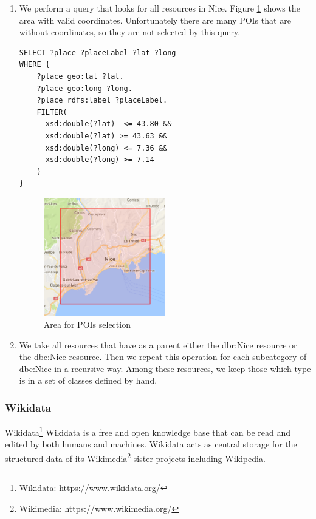 \documentclass[paper=a4, fontsize=11pt]{scrartcl}
\begin{document}
\begin{enumerate}
\item We perform a query that looks for all resources in Nice.
Figure \ref{fig:box} shows the area with valid coordinates.
Unfortunately there are many POIs that are without coordinates, so they are not selected by this query.
\begin{lstlisting}
SELECT ?place ?placeLabel ?lat ?long
WHERE {
    ?place geo:lat ?lat.
    ?place geo:long ?long.
    ?place rdfs:label ?placeLabel.
    FILTER(
      xsd:double(?lat)  <= 43.80 &&
      xsd:double(?lat) >= 43.63 &&
      xsd:double(?long) <= 7.36 &&
      xsd:double(?long) >= 7.14
    )
}
\end{lstlisting}
\begin{figure}[!htb]
  \centering
    \includegraphics[width=0.5\textwidth]{images/Nice.png}
    \caption{Area for POIs selection}
    \label{fig:box}
\end{figure}

\item We take all resources that have as a parent either the dbr:Nice resource or the dbc:Nice resource. Then we repeat this operation for each subcategory of dbc:Nice in a recursive way. Among these resources, we keep those which type is in a set of classes defined by hand.
\end{enumerate}
\subsubsection{Wikidata}
Wikidata\footnote{Wikidata: https://www.wikidata.org/} Wikidata is a free and open knowledge base that can be read and edited by both humans and machines. Wikidata acts as central storage for the structured data of its Wikimedia\footnote{Wikimedia: https://www.wikimedia.org/} sister projects including Wikipedia.
\end{document}
